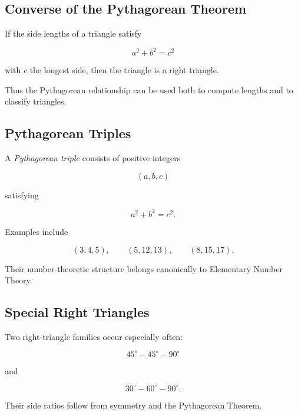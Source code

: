 \subsection{Converse of the Pythagorean Theorem}
\label{subsec:converse-pythagorean}

\begin{theorem}
If the side lengths of a triangle satisfy

\[ a^2+b^2=c^2 \]

with \(c\) the longest side, then the triangle is a right triangle.
\end{theorem}

Thus the Pythagorean relationship can be used both to compute lengths and to
classify triangles.

\subsection{Pythagorean Triples}
\label{subsec:pythagorean-triples-geometry}

A \emph{Pythagorean triple} consists of positive integers

\[ (a,b,c) \]

satisfying

\[ a^2+b^2=c^2. \]

Examples include

\[
(3,4,5),\qquad
(5,12,13),\qquad
(8,15,17).
\]

Their number-theoretic structure belongs canonically to Elementary Number
Theory.

\subsection{Special Right Triangles}
\label{subsec:special-right-triangles}

Two right-triangle families occur especially often:

\[
45^\circ-45^\circ-90^\circ
\]

and

\[
30^\circ-60^\circ-90^\circ.
\]

Their side ratios follow from symmetry and the Pythagorean Theorem.


